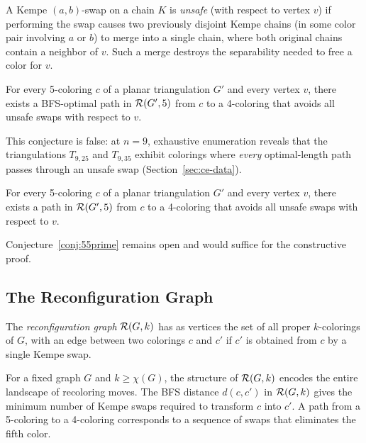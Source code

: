 \begin{definition}\label{def:unsafe-swap}
A Kempe $(a,b)$-swap on a chain $K$ is \emph{unsafe} (with respect to
vertex $v$) if performing the swap causes two previously disjoint
Kempe chains (in some color pair involving $a$ or $b$) to merge into a
single chain, where both original chains contain a neighbor of $v$.
Such a merge destroys the separability needed to free a color for $v$.
\end{definition}

\begin{conjecture}
\label{conj:55}
For every 5-coloring $c$ of a planar triangulation $G'$ and every
vertex $v$, there exists a BFS-optimal path in $\mathcal{R}(G', 5)$ from $c$ to
a 4-coloring that avoids all unsafe swaps with respect to $v$.
\end{conjecture}

This conjecture is false: at $n = 9$, exhaustive enumeration reveals that the triangulations $T_{9,25}$ and $T_{9,35}$ exhibit colorings where \emph{every} optimal-length path passes through an unsafe swap (Section~\ref{sec:ce-data}).

\begin{conjecture}
\label{conj:55prime}
For every 5-coloring $c$ of a planar triangulation $G'$ and every
vertex $v$, there exists a path in $\mathcal{R}(G', 5)$ from $c$ to a
4-coloring that avoids all unsafe swaps with respect to $v$.
\end{conjecture}

Conjecture~\ref{conj:55prime} remains open and would suffice for the
constructive proof.

\subsection{The Reconfiguration Graph}\label{sec:reconfig-graph}

\begin{definition}\label{def:reconfig-graph}
The \emph{reconfiguration graph} $\mathcal{R}(G, k)$ has as vertices the set
of all proper $k$-colorings of $G$, with an edge between two colorings
$c$ and $c'$ if $c'$ is obtained from $c$ by a single Kempe swap.
\end{definition}

For a fixed graph $G$ and $k \geq \chi(G)$, the structure of $\mathcal{R}(G, k)$
encodes the entire landscape of recoloring moves. The BFS distance
$d(c, c')$ in $\mathcal{R}(G, k)$ gives the minimum number of Kempe swaps
required to transform $c$ into $c'$. A path from a 5-coloring to a
4-coloring corresponds to a sequence of swaps that eliminates the fifth
color.

